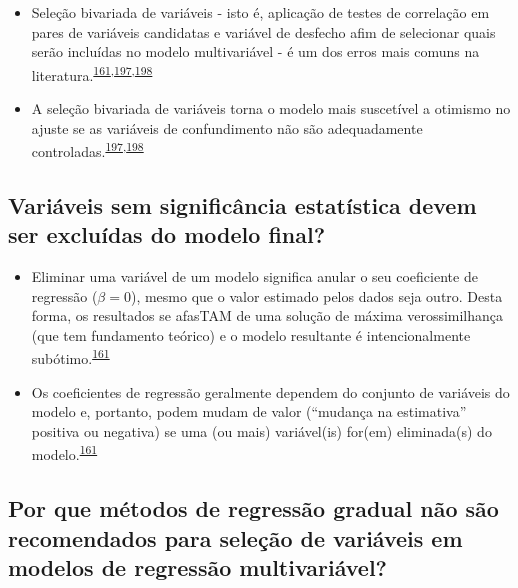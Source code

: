 \documentclass[
  a4paper,
]{book}
\begin{document}
\begin{itemize}
\item
  Seleção bivariada de variáveis - isto é, aplicação de testes de correlação em pares de variáveis candidatas e variável de desfecho afim de selecionar quais serão incluídas no modelo multivariável - é um dos erros mais comuns na literatura.\textsuperscript{\protect\hyperlink{ref-heinze2016}{161},\protect\hyperlink{ref-Dales1978}{197},\protect\hyperlink{ref-Sun1996}{198}}
\item
  A seleção bivariada de variáveis torna o modelo mais suscetível a otimismo no ajuste se as variáveis de confundimento não são adequadamente controladas.\textsuperscript{\protect\hyperlink{ref-Dales1978}{197},\protect\hyperlink{ref-Sun1996}{198}}
\end{itemize}

\hypertarget{variuxe1veis-sem-significuxe2ncia-estatuxedstica-devem-ser-excluuxeddas-do-modelo-final}{%
\subsection{Variáveis sem significância estatística devem ser excluídas do modelo final?}\label{variuxe1veis-sem-significuxe2ncia-estatuxedstica-devem-ser-excluuxeddas-do-modelo-final}}

\begin{itemize}
\item
  Eliminar uma variável de um modelo significa anular o seu coeficiente de regressão (\(\beta = 0\)), mesmo que o valor estimado pelos dados seja outro. Desta forma, os resultados se afasTAM de uma solução de máxima verossimilhança (que tem fundamento teórico) e o modelo resultante é intencionalmente subótimo.\textsuperscript{\protect\hyperlink{ref-heinze2016}{161}}
\item
  Os coeficientes de regressão geralmente dependem do conjunto de variáveis do modelo e, portanto, podem mudam de valor (``mudança na estimativa'' positiva ou negativa) se uma (ou mais) variável(is) for(em) eliminada(s) do modelo.\textsuperscript{\protect\hyperlink{ref-heinze2016}{161}}
\end{itemize}

\hypertarget{por-que-muxe9todos-de-regressuxe3o-gradual-nuxe3o-suxe3o-recomendados-para-seleuxe7uxe3o-de-variuxe1veis-em-modelos-de-regressuxe3o-multivariuxe1vel}{%
\subsection{Por que métodos de regressão gradual não são recomendados para seleção de variáveis em modelos de regressão multivariável?}\label{por-que-muxe9todos-de-regressuxe3o-gradual-nuxe3o-suxe3o-recomendados-para-seleuxe7uxe3o-de-variuxe1veis-em-modelos-de-regressuxe3o-multivariuxe1vel}}
\end{document}
